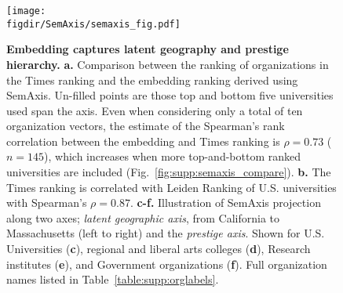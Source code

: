 \documentclass[12pt]{article} %
\def\figdir{../Figs}
\begin{document}
%
%
\begin{figure}[hp!]
	\centering
	\texttt{[image: \\figdir/SemAxis/semaxis\_fig.pdf]}
	\caption{
		\textbf{Embedding captures latent geography and prestige hierarchy.}
		\textbf{a.} Comparison between the ranking of organizations in the Times ranking and the embedding ranking derived using SemAxis.
		Un-filled points are those top and bottom five universities used span the axis.
	  	Even when considering only a total of ten organization vectors, the estimate of the Spearman's rank correlation between the embedding and Times ranking is $\rho = 0.73$ ($n = 145$), which increases when more top-and-bottom ranked universities are included (Fig.~\ref{fig:supp:semaxis_compare}).
	  	\textbf{b.} The Times ranking is correlated with Leiden Ranking of U.S. universities with Spearman's $\rho = 0.87$.
		\textbf{c-f.} Illustration of SemAxis projection along two axes;  \textit{latent geographic axis}, from California to Massachusetts (left to right) and the \textit{prestige axis}.
		Shown for U.S. Universities (\textbf{c}), regional and liberal arts colleges (\textbf{d}), Research institutes (\textbf{e}), and Government organizations (\textbf{f}).
		Full organization names listed in Table~\ref{table:supp:orglabels}.
	}
	\label{fig:semaxis}
\end{figure}
\end{document}
